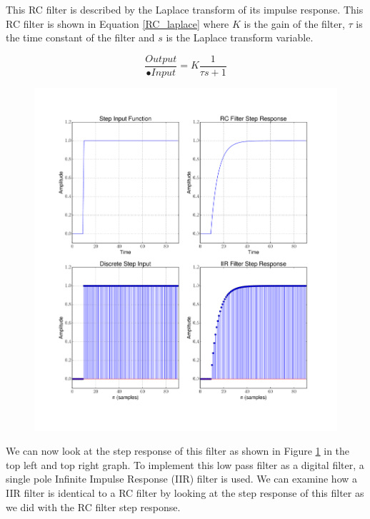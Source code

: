 This RC filter is described by the Laplace transform of its impulse response.  This RC filter is shown in Equation \ref{RC_laplace} where $K$ is the gain of the filter, $\tau$ is the time constant of the filter and $s$ is the Laplace transform variable.

\begin{equation}\label{RC_laplace}
\frac{Output}{•Input} = K \frac{1}{\tau s + 1}
\end{equation}

{\begin{figure}[h!tb] 
\centering
\includegraphics[width=17cm]{Experiments/Exp6/all_four.pdf}
\label{rc_response}
\end{figure}
}

We can now look at the step response of this filter as shown in Figure \ref{rc_response} in the top left and top right graph.  To implement this low pass filter as a digital filter, a single pole Infinite Impulse Response (IIR) filter is used.  We can examine how a IIR filter is identical to a RC filter by looking at the step response of this filter as we did with the RC filter step response.

